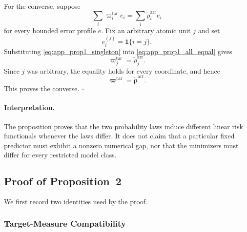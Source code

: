 \documentclass[letterpaper,journal]{IEEEtran}
\begin{document}
For the converse, suppose
\begin{equation}
    \sum_i \varpi_i^{\mathrm{tar}}e_i
    =
    \sum_i \widetilde\rho_i^{\mathrm{arr}}e_i
    \label{eq:app_prop1_all_equal}
\end{equation}
for every bounded error profile $e$.  Fix an arbitrary atomic unit $j$ and set
\begin{equation}
    e_i^{(j)}
    =
    \mathbf{1}\{i=j\}.
    \label{eq:app_prop1_singleton}
\end{equation}
Substituting \eqref{eq:app_prop1_singleton} into
\eqref{eq:app_prop1_all_equal} gives
\begin{equation}
    \varpi_j^{\mathrm{tar}}
    =
    \widetilde\rho_j^{\mathrm{arr}}.
    \label{eq:app_prop1_coordinate_equal}
\end{equation}
Since $j$ was arbitrary, the equality holds for every coordinate, and hence
\begin{equation}
    \boldsymbol\varpi^{\mathrm{tar}}
    =
    \widetilde{\boldsymbol\rho}^{\mathrm{arr}}.
\end{equation}
This proves the converse. \hfill$\square$

\paragraph{Interpretation.}
The proposition proves that the two probability laws induce different linear
risk functionals whenever the laws differ.  It does not claim that a particular
fixed predictor must exhibit a nonzero numerical gap, nor that the minimizers
must differ for every restricted model class.


\subsection{Proof of Proposition~2}
\label{app:proof_prop2}

We first record two identities used by the proof.

\subsubsection{Target-Measure Compatibility}
\end{document}
